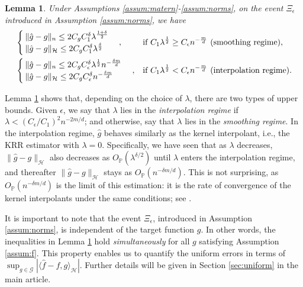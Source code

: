 \documentclass[12pt]{article}
\theoremstyle{plain}
\newtheorem{lemma}{Lemma}
\theoremstyle{remark}
\begin{document}
\begin{lemma}\label{Th:improved}
    Under Assumptions \ref{assum:matern}-\ref{assum:norms}, on the event $\Xi_\epsilon$ introduced in Assumption \ref{assum:norms}, we have
    \begin{align*}
          &  \begin{cases}
        \|\hat{g}-g\|_n\leq 2C_gC_1^\delta\lambda^{\frac{1+\delta}{2}}\\
        \|\hat{g}-g\|_\mathcal{H}\leq 2C_gC_1^\delta\lambda^{\frac{\delta}{2}}
    \end{cases}, & \text{if } C_1\lambda^{\frac{1}{2}}\geq C_\epsilon n^{-\frac{m}{d}} & \text{ (\textbf{smoothing regime})},\\
          &  \begin{cases}
        \|\hat{g}-g\|_n\leq 2C_gC_\epsilon^\delta\lambda^{\frac{1}{2}}n^{-\frac{\delta m}{d}}\\
        \|\hat{g}-g\|_\mathcal{H}\leq 2C_gC_\epsilon^\delta n^{-\frac{\delta m}{d}}
    \end{cases}, & \text{if } C_1\lambda^{\frac{1}{2}}< C_\epsilon n^{-\frac{m}{d}} & \text{ (\textbf{interpolation regime})}.
    \end{align*}
\end{lemma}

Lemma \ref{Th:improved} shows that, depending on the choice of $\lambda$, there are two types of upper bounds. Given $\epsilon$, we say that $\lambda$ lies in the \textit{interpolation regime} if $\lambda<(C_\epsilon/C_1)^{2}n^{-2m/d}$; and otherwise, say that $\lambda$ lies in the \textit{smoothing regime}. In the interpolation regime, $\hat{g}$ behaves similarly as the kernel interpolant, i.e., the KRR estimator with $\lambda=0$. Specifically, we have seen that as $\lambda$ decreases, $\|\hat{g}-g\|_\mathcal{H}$ also decreases as $O_\mathbb{P}(\lambda^{\delta/2})$ until $\lambda$ enters the interpolation regime, and thereafter $\|\hat{g}-g\|_\mathcal{H}$ stays as $O_\mathbb{P}(n^{-\delta m/d})$. This is not surprising, as $O_\mathbb{P}(n^{-\delta m/d})$ is the limit of this estimation: it is the rate of convergence of the kernel interpolants under the same conditions; see \cite{tuo2023privacy,wendland2004scattered}.

It is important to note that the event $\Xi_\epsilon$, introduced in Assumption \ref{assum:norms}, is independent of the target function $g$. In other words, the inequalities in Lemma \ref{Th:improved} hold \textit{simultaneously} for all $g$ satisfying Assumption \ref{assum:f}. This property enables us to quantify the uniform errors in terms of $\sup_{g\in\mathcal{G}}|\langle \hat{f}-f,g\rangle_\mathcal{H}|$. Further details will be given in Section \ref{sec:uniform} in the main article.
\end{document}
